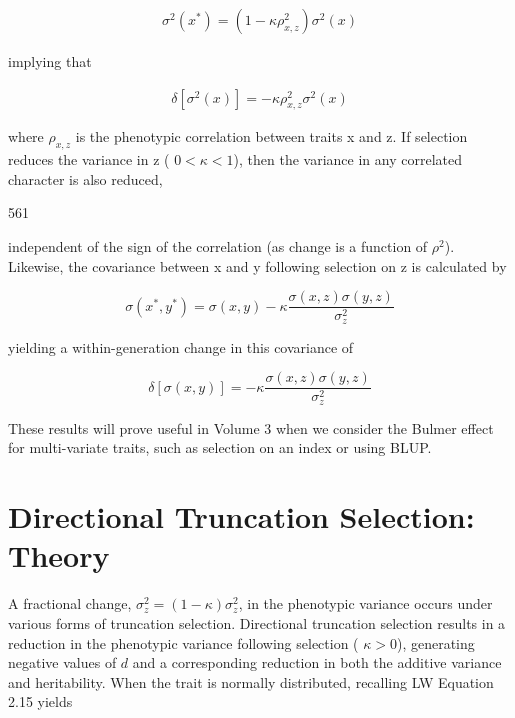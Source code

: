 \documentclass{article}
\begin{document}
\begin{equation}
\begin{align*}\sigma^2(x^*)=(1-\kappa\rho^2_{x,z})\sigma^2(x)\end{align*}
\tag{16.14a}
\label{eq:16_14a}
\end{equation}

implying that

\begin{equation}
\begin{align*}\delta\left[\sigma^2(x)\right]=-\kappa\rho^2_{x,z}\sigma^2(x)\end{align*}
\tag{16.14b}
\label{eq:16_14b}
\end{equation}

where  $ \rho_{x,z} $ is the phenotypic correlation between traits x and z. If selection reduces the variance in z ( $ 0 < \kappa < 1 $), then the variance in any correlated character is also reduced,

561

independent of the sign of the correlation (as change is a function of  $ \rho^{2} $). Likewise, the covariance between x and y following selection on z is calculated by

\begin{equation}
\sigma(x^{*},y^{*})=\sigma(x,y)-\kappa\frac{\sigma(x,z)\sigma(y,z)}{\sigma_{z}^{2}}
\tag{16.14c}
\label{eq:16_14c}
\end{equation}

yielding a within-generation change in this covariance of

\begin{equation}
\delta\left[\sigma(x,y)\right]=-\kappa\frac{\sigma(x,z)\sigma(y,z)}{\sigma_{z}^{2}}
\tag{16.14d}
\label{eq:16_14d}
\end{equation}

These results will prove useful in Volume 3 when we consider the Bulmer effect for multi-variate traits, such as selection on an index or using BLUP.

\section{Directional Truncation Selection: Theory}
A fractional change,  $ \sigma_z^2 = (1 - \kappa) \sigma_z^2 $, in the phenotypic variance occurs under various forms of truncation selection. Directional truncation selection results in a reduction in the phenotypic variance following selection ( $ \kappa > 0 $), generating negative values of  $ d $ and a corresponding reduction in both the additive variance and heritability. When the trait is normally distributed, recalling LW Equation 2.15 yields
\end{document}
